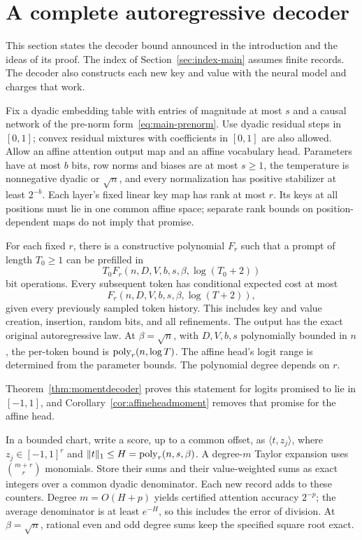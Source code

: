 \section{A complete autoregressive decoder}
\label{sec:full-decoder-main}

This section states the decoder bound announced in the introduction
and the ideas of its proof. The index of Section~\ref{sec:index-main}
assumes finite records. The decoder also constructs each new key and
value with the neural model and charges that work.

Fix a dyadic embedding table with entries of magnitude at most $s$
and a causal network of the pre-norm form~\eqref{eq:main-prenorm}.
Use dyadic residual steps in $[0,1]$; convex residual mixtures with
coefficients in $[0,1]$ are also allowed. Allow an affine attention
output map and an affine vocabulary head. Parameters have at most $b$ bits,
row norms and biases are at most $s\ge1$, the temperature is
nonnegative dyadic or $\sqrt n$, and every normalization
has positive stabilizer at least $2^{-b}$. Each layer's fixed
linear key map has rank at most $r$. Its keys at all positions
must lie in one common affine space; separate rank bounds on
position-dependent maps do not imply that promise.

\begin{theorem}
\label{thm:main-decoder}
For each fixed $r$, there is a constructive polynomial $F_r$
such that a prompt of length $T_0\ge1$ can be prefilled in
\[
 T_0F_r(n,D,V,b,s,\beta,\log(T_0+2))
\]
bit operations. Every subsequent token has conditional expected
cost at most
\[
 F_r(n,D,V,b,s,\beta,\log(T+2)),
\]
given every previously sampled token history. This includes key
and value creation, insertion, random bits, and all refinements.
The output has the exact original autoregressive law.
At $\beta=\sqrt n$, with $D,V,b,s$ polynomially bounded in $n$,
the per-token bound is $\operatorname{poly}_r(n,\log T)$.
The affine head's logit range is determined from the parameter
bounds. The polynomial degree depends on $r$.
\end{theorem}

Theorem~\ref{thm:momentdecoder} proves this statement for logits
promised to lie in $[-1,1]$, and Corollary~\ref{cor:affineheadmoment}
removes that promise for the affine head.

In a bounded chart, write a score, up to a common offset, as
$\langle t,z_j\rangle$, where $z_j\in[-1,1]^r$ and
$\|t\|_1\le H=\operatorname{poly}_r(n,s,\beta)$. A degree-$m$ Taylor
expansion uses $\binom{m+r}{r}$ monomials. Store their sums
and their value-weighted sums as exact integers over a common
dyadic denominator. Each new record adds to these counters.
Degree $m=O(H+p)$ yields certified attention accuracy $2^{-p}$;
the average denominator is at least $e^{-H}$, so this includes
the error of division. At $\beta=\sqrt n$, rational even and
odd degree sums keep the specified square root exact.

